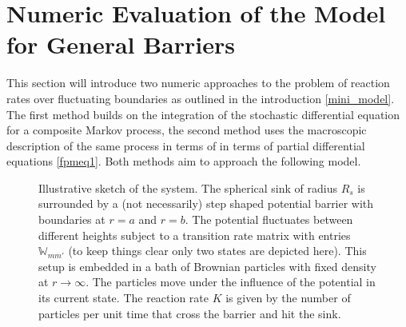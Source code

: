 \chapter{Numeric Evaluation of the Model for General Barriers}
\label{numeric_model}
This section will introduce two numeric approaches to the problem of reaction rates over fluctuating boundaries as outlined in the introduction \ref{mini_model}. The first method builds on the integration of the stochastic differential equation for a composite Markov process, the second method uses the macroscopic description of the same process in terms of in terms of partial differential equations \eqref{fpmeq1}. Both methods aim to approach the following model.\\

\begin{minipage}[t]{.5 \textwidth}
    \begin{figure}[H]
 \hspace{-1.8 cm}       
    \end{figure}
\end{minipage}\hspace{0.05 \textwidth}\begin{minipage}[t]{.45\textwidth}
    \begin{figure}[H]
        \caption{Illustrative sketch of the system. The spherical sink of radius $R_s$ is surrounded by a (not necessarily) step shaped potential barrier with boundaries at $r=a$ and $r=b$. The potential fluctuates between different heights subject to a transition rate matrix with entries $\mathbb{W}_{mm'}$ (to keep things clear only two states are depicted here). This setup is embedded in a bath of Brownian particles with fixed density at $r \rightarrow \infty$. The particles move under the influence of the potential in its current state. The reaction rate $K$ is given by the number of particles per unit time that cross the barrier and hit the sink.\label{skizze}}
    \end{figure}
\end{minipage}

